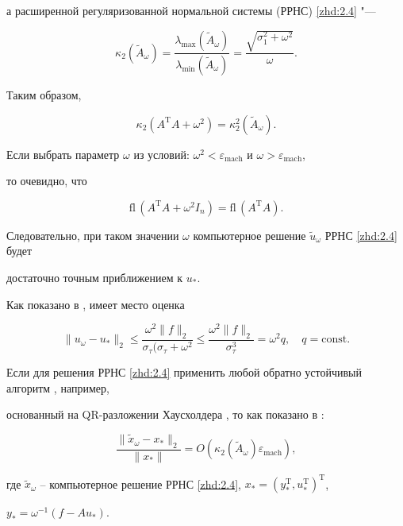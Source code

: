 а расширенной регуляризованной нормальной системы (РРНС) \eqref{zhd:2.4} "---

$$ \kappa_2(\tilde A_\omega)=\frac{\lambda_{\max}(\tilde A_\omega)}{\lambda_{\min}(\tilde A_\omega)}=

   \frac{\sqrt{\sigma_1^2+\omega^2}}{\omega}. $$



Таким образом,

$$ \kappa_2(A^\mathrm{T}A+\omega^2)=\kappa_2^2(\tilde A_\omega). $$



Если выбрать параметр $\omega$ из условий: $\omega^2<\varepsilon_\mathrm{mach}$ и $\omega>\varepsilon_\mathrm{mach}$,

то очевидно, что

$$ \mathrm{fl}\,(A^\mathrm{T}A+\omega^2I_n)=\mathrm{fl}\,(A^\mathrm{T}A). $$

Следовательно, при таком значении $\omega$ компьютерное решение $\tilde u_\omega$ РРНС \eqref{zhd:2.4} будет

достаточно точным приближением к $u_*$.



Как показано в \cite[стр.\,210]{zhdanov:Bekl}, имеет место оценка

$$ \|u_\omega-u_*\|_2\leq\frac{\omega^2\|f\|_2}{\sigma_\tau(\sigma_\tau+\omega^2}\leq\frac{\omega^2\|f\|_2}{\sigma_\tau^3}=

   \omega^2q, \quad q=\mathrm{const}. $$

Если для решения РРНС \eqref{zhd:2.4} применить любой обратно устойчивый алгоритм \cite{zhdanov:Zhd}, например,

основанный на QR-разложении Хаусхолдера \cite{zhdanov:Golub}, то как показано в \cite{zhdanov:Tref}:

\begin{equation}\label{zhd:2.8}

    \frac{\|\tilde x_\omega-x_*\|_2}{\|x_*\|}=O(\kappa_2(\tilde A_\omega)\varepsilon_\mathrm{mach}),

\end{equation}

где $\tilde x_\omega$ -- компьютерное решение РРНС \eqref{zhd:2.4}, $x_*=(y_*^\mathrm{T}, u_*^\mathrm{T})^\mathrm{T}$,

$y_*=\omega^{-1}(f-Au_*)$.






